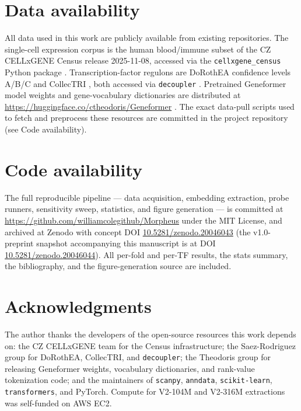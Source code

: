 \documentclass[
  11pt,
]{article}
\begin{document}
\section*{Data availability}

All data used in this work are publicly available from existing repositories. The single-cell expression corpus is the human blood/immune subset of the CZ CELLxGENE Census release 2025-11-08, accessed via the \texttt{cellxgene\_census} Python package \citep{cellxgene2025}. Transcription-factor regulons are DoRothEA confidence levels A/B/C \citep{garciaalonso2019dorothea} and CollecTRI \citep{mullerdott2023collectri}, both accessed via \texttt{decoupler} \citep{badiaimompel2022decoupler}. Pretrained Geneformer model weights and gene-vocabulary dictionaries are distributed at \url{https://huggingface.co/ctheodoris/Geneformer} \citep{theodoris2023}. The exact data-pull scripts used to fetch and preprocess these resources are committed in the project repository (see Code availability).

\section*{Code availability}

The full reproducible pipeline --- data acquisition, embedding extraction, probe runners, sensitivity sweep, statistics, and figure generation --- is committed at \url{https://github.com/williamcolegithub/Morpheus} under the MIT License, and archived at Zenodo with concept DOI \href{https://doi.org/10.5281/zenodo.20046043}{10.5281/zenodo.20046043} (the v1.0-preprint snapshot accompanying this manuscript is at DOI \href{https://doi.org/10.5281/zenodo.20046044}{10.5281/zenodo.20046044}). All per-fold and per-TF results, the stats summary, the bibliography, and the figure-generation source are included.

\section*{Acknowledgments}

The author thanks the developers of the open-source resources this work depends on: the CZ CELLxGENE team for the Census infrastructure; the Saez-Rodriguez group for DoRothEA, CollecTRI, and \texttt{decoupler}; the Theodoris group for releasing Geneformer weights, vocabulary dictionaries, and rank-value tokenization code; and the maintainers of \texttt{scanpy}, \texttt{anndata}, \texttt{scikit-learn}, \texttt{transformers}, and PyTorch. Compute for V2-104M and V2-316M extractions was self-funded on AWS EC2.
\end{document}
